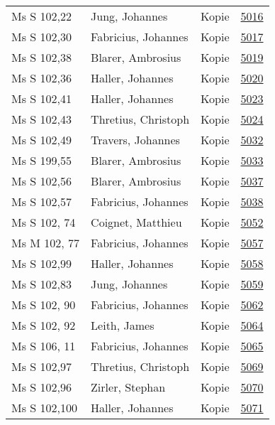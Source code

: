 \documentclass[10pt,a4paper,landscape]{report}
\begin{document}
\begin{longtable}{p{16cm}p{4cm}lr}
Ms S 102,22	&	Jung, Johannes	&	Kopie	&	\href{http://130.60.24.72/assignment/5016}{5016}\\
Ms S 102,30	&	Fabricius, Johannes	&	Kopie	&	\href{http://130.60.24.72/assignment/5017}{5017}\\
Ms S 102,38	&	Blarer, Ambrosius	&	Kopie	&	\href{http://130.60.24.72/assignment/5019}{5019}\\
Ms S 102,36	&	Haller, Johannes	&	Kopie	&	\href{http://130.60.24.72/assignment/5020}{5020}\\
Ms S 102,41	&	Haller, Johannes	&	Kopie	&	\href{http://130.60.24.72/assignment/5023}{5023}\\
Ms S 102,43	&	Thretius, Christoph	&	Kopie	&	\href{http://130.60.24.72/assignment/5024}{5024}\\
Ms S 102,49	&	Travers, Johannes	&	Kopie	&	\href{http://130.60.24.72/assignment/5032}{5032}\\
Ms S 199,55	&	Blarer, Ambrosius	&	Kopie	&	\href{http://130.60.24.72/assignment/5033}{5033}\\
Ms S 102,56	&	Blarer, Ambrosius	&	Kopie	&	\href{http://130.60.24.72/assignment/5037}{5037}\\
Ms S 102,57	&	Fabricius, Johannes	&	Kopie	&	\href{http://130.60.24.72/assignment/5038}{5038}\\
Ms S 102, 74	&	Coignet, Matthieu	&	Kopie	&	\href{http://130.60.24.72/assignment/5052}{5052}\\
Ms M 102, 77	&	Fabricius, Johannes	&	Kopie	&	\href{http://130.60.24.72/assignment/5057}{5057}\\
Ms S 102,99	&	Haller, Johannes	&	Kopie	&	\href{http://130.60.24.72/assignment/5058}{5058}\\
Ms S 102,83	&	Jung, Johannes	&	Kopie	&	\href{http://130.60.24.72/assignment/5059}{5059}\\
Ms S 102, 90	&	Fabricius, Johannes	&	Kopie	&	\href{http://130.60.24.72/assignment/5062}{5062}\\
Ms S 102, 92	&	Leith, James	&	Kopie	&	\href{http://130.60.24.72/assignment/5064}{5064}\\
Ms S 106, 11	&	Fabricius, Johannes	&	Kopie	&	\href{http://130.60.24.72/assignment/5065}{5065}\\
Ms S 102,97	&	Thretius, Christoph	&	Kopie	&	\href{http://130.60.24.72/assignment/5069}{5069}\\
Ms S 102,96	&	Zirler, Stephan	&	Kopie	&	\href{http://130.60.24.72/assignment/5070}{5070}\\
Ms S 102,100	&	Haller, Johannes	&	Kopie	&	\href{http://130.60.24.72/assignment/5071}{5071}\\

\end{longtable}
\end{document}
